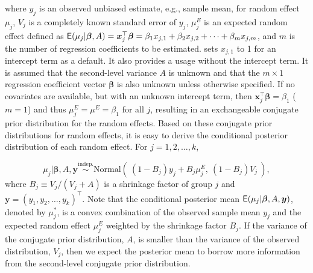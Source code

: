 \documentclass[article]{jss}
\begin{document}
where $y_j$ is an observed unbiased estimate, e.g., sample mean, for random effect $\mu_j$, $V_{j}$ is a completely known standard error of $y_j$, $\mu^E_{j}$ is an expected random effect defined as $\mathsf{E}(\mu_j\vert \boldsymbol{\beta}, A) = \boldsymbol{x}_j^\top \boldsymbol{\beta}=\beta_{1}x_{j, 1}+\beta_{2}x_{j, 2} + \cdots + \beta_{m}x_{j, m}$, and $m$ is the number of regression coefficients to be estimated.  sets $x_{j, 1}$ to 1 for an intercept term as a default. It also provides a usage without the intercept term.  It is assumed that the second-level variance $A$ is unknown and that the $m\times1$ regression coefficient vector $\boldsymbol{\beta}$ is also unknown unless otherwise specified. If no covariates are available, but with an unknown intercept term, then $\boldsymbol{x}_j^\top \boldsymbol{\beta}=\beta_1$ ($m=1$) and thus $\mu^E_{j}=\mu^E=\beta_1$ for all $j$, resulting in an exchangeable conjugate prior distribution for the random effects.  Based on these conjugate prior distributions for random effects, it is easy to derive the conditional posterior distribution of each random effect. For $j=1, 2, \ldots, k$,

\begin{equation} \label{normalpost}
\mu_{j}\vert  \boldsymbol{\beta}, A, \boldsymbol{y} \stackrel{\textrm{indep.}}{\sim}\textrm{Normal}(~(1-B_{j})y_{j} + B_{j}\mu^E_{j},~(1-B_{j})V_{j}~),
\end{equation}
where $B_{j}\equiv V_{j}/(V_{j} + A)$ is a shrinkage factor of group $j$ and $\boldsymbol{y}=(y_1, y_2, \ldots, y_k)^\top$. Note that the conditional posterior mean $\mathsf{E}(\mu_{j}\vert \boldsymbol{\beta}, A, \boldsymbol{y} )$, denoted by $\mu^\ast_j$,  is a convex combination of the observed sample mean $y_j$ and the expected random effect $\mu^E_j$ weighted by the shrinkage factor $B_j$. If the variance of the conjugate prior distribution, $A$, is smaller than the variance of the observed distribution, $V_j$, then we expect the posterior mean to borrow more information from the second-level conjugate prior distribution.

\end{document}

